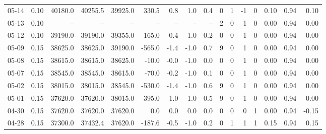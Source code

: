 \begin{threeparttable}
{\begin{tabular}{lrrrrrrrrrrrrrrr}
  05-14 &     0.10 & 40180.0 & 40255.5 & 39925.0 &      330.5 &            0.8 &                      1.0 &                 0.4 &              0 &         1 &    -1 &         0 &       0.10 &      0.94 &           0.10 \\
  05-13 &     0.10 &      -- &      -- &      -- &         -- &             -- &                       -- &                  -- &              2 &         0 &     1 &         0 &       0.00 &      0.94 &           0.00 \\
  05-12 &     0.10 & 39190.0 & 39190.0 & 39355.0 &     -165.0 &           -0.4 &                     -1.0 &                 0.2 &              0 &         0 &     1 &         0 &       0.00 &      0.94 &           0.00 \\
  05-09 &     0.15 & 38625.0 & 38625.0 & 39190.0 &     -565.0 &           -1.4 &                     -1.0 &                 0.7 &              9 &         0 &     1 &         0 &       0.00 &      0.94 &           0.00 \\
  05-08 &     0.15 & 38615.0 & 38615.0 & 38625.0 &      -10.0 &           -0.0 &                     -1.0 &                 0.0 &              0 &         0 &     1 &         0 &       0.00 &      0.94 &           0.00 \\
  05-07 &     0.15 & 38545.0 & 38545.0 & 38615.0 &      -70.0 &           -0.2 &                     -1.0 &                 0.1 &              0 &         0 &     1 &         0 &       0.00 &      0.94 &           0.00 \\
  05-02 &     0.15 & 38015.0 & 38015.0 & 38545.0 &     -530.0 &           -1.4 &                     -1.0 &                 0.6 &              9 &         0 &     1 &         0 &       0.00 &      0.94 &           0.00 \\
  05-01 &     0.15 & 37620.0 & 37620.0 & 38015.0 &     -395.0 &           -1.0 &                     -1.0 &                 0.5 &              9 &         0 &     1 &         0 &       0.00 &      0.94 &           0.00 \\
  04-30 &     0.15 & 37620.0 & 37620.0 & 37620.0 &        0.0 &            0.0 &                      0.0 &                 0.0 &              0 &         0 &     0 &         1 &       0.00 &      0.94 &          -0.15 \\
  04-28 &     0.15 & 37300.0 & 37432.4 & 37620.0 &     -187.6 &           -0.5 &                     -1.0 &                 0.2 &              0 &         1 &     1 &         1 &       0.15 &      0.94 &           0.15 \\

\end{tabular}}
\end{threeparttable}
